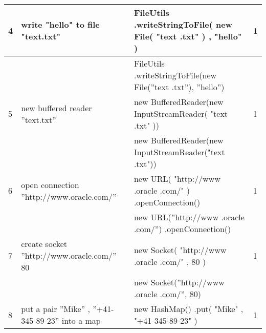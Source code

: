 \begin{longtable}{|p{}|p{}|p{}|p{}|}
		\rowcolor[HTML]{FFCCC9} 
		4                                 & write "hello" to file "text.txt"                       & FileUtils .writeStringToFile( new File( "text .txt" ) , "hello" )                                                & 1                                       \\ \hline
		\rowcolor[HTML]{9AFF99} 
		&                                                        & FileUtils .writeStringToFile(new File(”text .txt”), ”hello”)                                                     &                                         \\ \hline
		\rowcolor[HTML]{FFCCC9} 
		5                                 & new buffered reader ”text.txt”                         & new BufferedReader(new InputStreamReader( "text .txt" ))                                                         & 1                                       \\ \hline
		\rowcolor[HTML]{9AFF99} 
		&                                                        & new BufferedReader(new InputStreamReader("text .txt"))                                                           &                                         \\ \hline
		\rowcolor[HTML]{FFCCC9} 
		6                                 & open connection ”http://www.oracle.com/”               & new URL( "http://www .oracle .com/" ) .openConnection()                                                          & 1                                       \\ \hline
		\rowcolor[HTML]{9AFF99} 
		&                                                        & new URL(”http://www .oracle .com/”) .openConnection()                                                            &                                         \\ \hline
		\rowcolor[HTML]{FFCCC9} 
		7                                 & create socket ”http://www.oracle.com/” 80              & new Socket( "http://www .oracle .com/" , 80 )                                                                    & 1                                       \\ \hline
		\rowcolor[HTML]{9AFF99} 
		&                                                        & new Socket(”http://www .oracle .com/”, 80)                                                                       &                                         \\ \hline
		\rowcolor[HTML]{FFCCC9} 
		8                                 & put a pair ”Mike” , ”+41-345-89-23” into a map         & new HashMap() .put( "Mike" , "+41-345-89-23" )                                                                   & 1                                       \\ \hline

\end{longtable}
